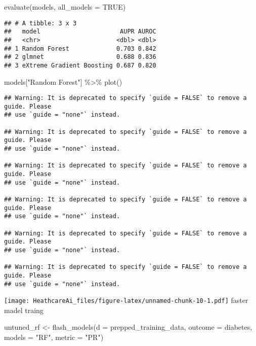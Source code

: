 \documentclass[
]{article}
\newenvironment{Shaded}{\begin{snugshade}}{\end{snugshade}}
\newcommand{\AttributeTok}[1]{\textcolor[rgb]{0.77,0.63,0.00}{#1}}
\newcommand{\ConstantTok}[1]{\textcolor[rgb]{0.00,0.00,0.00}{#1}}
\newcommand{\FunctionTok}[1]{\textcolor[rgb]{0.00,0.00,0.00}{#1}}
\newcommand{\NormalTok}[1]{#1}
\newcommand{\OtherTok}[1]{\textcolor[rgb]{0.56,0.35,0.01}{#1}}
\newcommand{\SpecialCharTok}[1]{\textcolor[rgb]{0.00,0.00,0.00}{#1}}
\newcommand{\StringTok}[1]{\textcolor[rgb]{0.31,0.60,0.02}{#1}}
\begin{document}
\begin{Shaded}
\begin{Highlighting}[]
\FunctionTok{evaluate}\NormalTok{(models, }\AttributeTok{all\_models =} \ConstantTok{TRUE}\NormalTok{)}
\end{Highlighting}
\end{Shaded}

\begin{verbatim}
## # A tibble: 3 x 3
##   model                      AUPR AUROC
##   <chr>                     <dbl> <dbl>
## 1 Random Forest             0.703 0.842
## 2 glmnet                    0.688 0.836
## 3 eXtreme Gradient Boosting 0.687 0.820
\end{verbatim}

\begin{Shaded}
\begin{Highlighting}[]
\NormalTok{models[}\StringTok{"Random Forest"}\NormalTok{] }\SpecialCharTok{\%\textgreater{}\%}
  \FunctionTok{plot}\NormalTok{()}
\end{Highlighting}
\end{Shaded}

\begin{verbatim}
## Warning: It is deprecated to specify `guide = FALSE` to remove a guide. Please
## use `guide = "none"` instead.

## Warning: It is deprecated to specify `guide = FALSE` to remove a guide. Please
## use `guide = "none"` instead.

## Warning: It is deprecated to specify `guide = FALSE` to remove a guide. Please
## use `guide = "none"` instead.

## Warning: It is deprecated to specify `guide = FALSE` to remove a guide. Please
## use `guide = "none"` instead.

## Warning: It is deprecated to specify `guide = FALSE` to remove a guide. Please
## use `guide = "none"` instead.

## Warning: It is deprecated to specify `guide = FALSE` to remove a guide. Please
## use `guide = "none"` instead.
\end{verbatim}

\texttt{[image: HeathcareAi\_files/figure-latex/unnamed-chunk-10-1.pdf]}
faster madel traing

\begin{Shaded}
\begin{Highlighting}[]
\NormalTok{untuned\_rf }\OtherTok{\textless{}{-}} \FunctionTok{flash\_models}\NormalTok{(}\AttributeTok{d =}\NormalTok{ prepped\_training\_data,}
                           \AttributeTok{outcome =}\NormalTok{ diabetes,}
                           \AttributeTok{models =} \StringTok{"RF"}\NormalTok{,}
                           \AttributeTok{metric =} \StringTok{"PR"}\NormalTok{)}
\end{Highlighting}
\end{Shaded}
\end{document}
